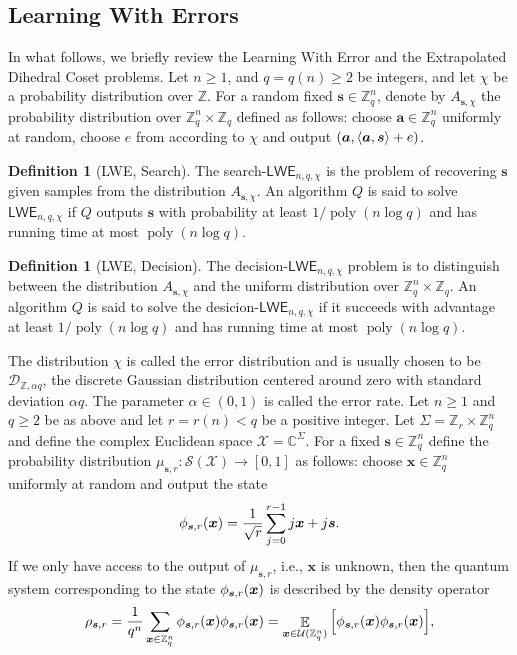 \documentclass[11pt]{article}
\theoremstyle{plain}
\theoremstyle{definition}
\newtheorem{definition}[theorem]{Definition}
\DeclareMathOperator{\poly}{poly}
\DeclareMathOperator{\E}{\mathbb{E}}
\let\ket\relax
\DeclarePairedDelimiter{\ket}{\lvert}{\rangle}
\let\bra\relax
\DeclarePairedDelimiter{\bra}{\langle}{\rvert}
\DeclarePairedDelimiter{\lrang}{\langle}{\rangle}
\def\C{\mathbb{C}}
\def\Z{\mathbb{Z}}
\def\lwe{\mathsf{LWE}}
\def\X{\mathcal{X}}
\def\SX{\mathcal{S(X)}}
\def\U{\mathcal{U}}
\begin{document}
\subsection{Learning With Errors}

In what follows, we briefly review the Learning With Error and the Extrapolated Dihedral Coset problems. Let $n \ge 1$, and $q = q(n) \ge 2$ be integers, and let $\chi$ be a probability distribution over $\Z$. For a random fixed $\bm{s} \in \Z_q^n$, denote by $A_{\bm{s}, \chi}$ the probability distribution over $\Z_q^n \times \Z_q$ defined as follows: choose $\bm{a} \in \Z_q^n$ uniformly at random, choose $e$ from according to $\chi$ and output  $(\bm{a}, \lrang{\bm{a}, \bm{s}} + e)$.
\begin{definition}[LWE, Search]
The search-$\lwe_{n, q, \chi}$ is the problem of recovering $\bm{s}$ given samples from the distribution $A_{\bm{s}, \chi}$. An algorithm $Q$ is said to solve $\lwe_{n, q, \chi}$ if $Q$  outputs $\bm{s}$ with probability at least $1 / \poly(n\log q)$ and has running time at most $\poly(n \log q)$.
\end{definition}
\begin{definition}[LWE, Decision]
    The decision-$\lwe_{n, q, \chi}$ problem is to distinguish between the distribution $A_{\bm{s}, \chi}$ and the uniform distribution over $\Z_q^n \times \Z_q$. An algorithm $Q$ is said to solve the desicion-$\lwe_{n, q, \chi}$ if it succeeds with advantage at least $1 / \poly(n\log q)$ and has running time at most $\poly(n\log q)$. 
\end{definition}
The distribution $\chi$ is called the error distribution and is usually chosen to be $\mathcal{D}_{\Z, \alpha q}$, the discrete Gaussian distribution centered around zero with standard deviation $\alpha q$. The parameter $\alpha \in (0, 1)$ is called the error rate. Let $n \ge 1$ and $q \ge 2$ be as above and let $r = r(n) < q$ be a positive integer. Let $\Sigma = \Z_r \times \Z_q^n$ and define the complex Euclidean space $\X = \C^\Sigma$. For a fixed $\bm{s} \in \Z_q^n$ define the probability distribution $\mu_{\bm{s}, r}: \SX \rightarrow [0, 1]$ as follows: choose $\bm{x} \in \Z_q^n$ uniformly at random and output the state
\[ \ket{\phi_{\bm{s}, r}(\bm{x})} = \frac{1}{\sqrt{r}} \sum_{j = 0}^{r - 1}\ket{j}\ket{\bm{x} + j\bm{s}}. \]
If we only have access to the output of $\mu_{\bm{s}, r}$, i.e., $\bm{x}$ is unknown, then the quantum system corresponding to the state $\ket{\phi_{\bm{s}, r}(\bm{x})}$ is described by the density operator
\[ \rho_{\bm{s}, r} = \frac{1}{q^n} \sum_{\bm{x} \in \Z_q^n} \ket{\phi_{\bm{s}, r}(\bm{x})} \bra{\phi_{\bm{s}, r}(\bm{x})} = \E_{\bm{x} \in \U(\Z_q^n)} \Big[ \ket{\phi_{\bm{s}, r}(\bm{x})} \bra{\phi_{\bm{s}, r}(\bm{x})} \Big], \]
\end{document}
